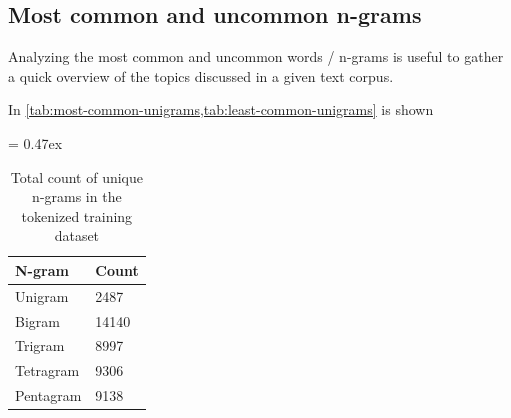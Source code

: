 \subsection{Most common and uncommon n-grams}

Analyzing the most common and uncommon words / n-grams is useful to gather a quick overview of the topics discussed in a given text corpus.

In \cref{tab:most-common-unigrams,tab:least-common-unigrams} is shown


\begin{table}[t]
	\caption{Total count of unique n-grams in the tokenized training dataset}
	\extrarowsep = 0.47ex
	\centering
	\begin{tabu} to 0.18\textwidth { X[l,m] X[r,m] }
		\rowfont{\bfseries\itshape} N-gram & Count \\
		\hline
		Unigram		&	 2487	\\
		Bigram		&	14140	\\
		Trigram		&	 8997	\\
		Tetragram	&	 9306	\\
		Pentagram	& 	 9138	\\
	\end{tabu}
	\label{tab:n-grams-counts}
\end{table}



